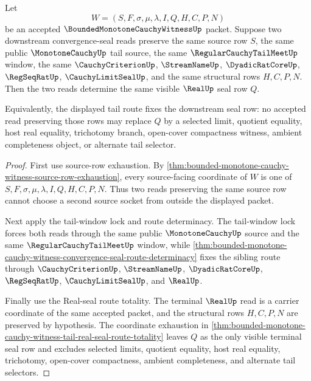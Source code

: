 \begin{theorem}
\label{thm:bounded-monotone-cauchy-witness-tail-seal-row-determinacy}
Let
$$
W=(S,F,\sigma,\mu,\lambda,I,Q,H,C,P,N)
$$
be an accepted $\BoundedMonotoneCauchyWitnessUp$ packet. Suppose two downstream convergence-seal reads preserve the same source row $S$, the same public $\MonotoneCauchyUp$ tail source, the same $\RegularCauchyTailMeetUp$ window, the same $\CauchyCriterionUp$, $\StreamNameUp$, $\DyadicRatCoreUp$, $\RegSeqRatUp$, $\CauchyLimitSealUp$, and the same structural rows $H,C,P,N$. Then the two reads determine the same visible $\RealUp$ seal row $Q$.

Equivalently, the displayed tail route fixes the downstream seal row: no accepted read preserving those rows may replace $Q$ by a selected limit, quotient equality, host real equality, trichotomy branch, open-cover compactness witness, ambient completeness object, or alternate tail selector.
\end{theorem}
\begin{proof}
First use source-row exhaustion. By \autoref{thm:bounded-monotone-cauchy-witness-source-row-exhaustion}, every source-facing coordinate of $W$ is one of $S,F,\sigma,\mu,\lambda,I,Q,H,C,P,N$. Thus two reads preserving the same source row cannot choose a second source socket from outside the displayed packet.

Next apply the tail-window lock and route determinacy. The tail-window lock forces both reads through the same public $\MonotoneCauchyUp$ source and the same $\RegularCauchyTailMeetUp$ window, while \autoref{thm:bounded-monotone-cauchy-witness-convergence-seal-route-determinacy} fixes the sibling route through $\CauchyCriterionUp$, $\StreamNameUp$, $\DyadicRatCoreUp$, $\RegSeqRatUp$, $\CauchyLimitSealUp$, and $\RealUp$.

Finally use the Real-seal route totality. The terminal $\RealUp$ read is a carrier coordinate of the same accepted packet, and the structural rows $H,C,P,N$ are preserved by hypothesis. The coordinate exhaustion in \autoref{thm:bounded-monotone-cauchy-witness-tail-real-seal-route-totality} leaves $Q$ as the only visible terminal seal row and excludes selected limits, quotient equality, host real equality, trichotomy, open-cover compactness, ambient completeness, and alternate tail selectors.
\end{proof}

